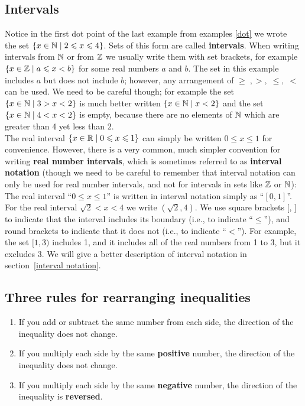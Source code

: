 
\subsection{Intervals}
Notice in the first dot point of the last example from examples \ref{dot} we wrote \\ the set $\left\{x \in \mathbb{N} \mid 2 \leqslant x \leqslant 4\right\}$. Sets of this form are called \textbf{intervals}. \label{intervals} When writing intervals from $\mathbb{N}$ or from $\mathbb{Z}$ we usually write them with set brackets, for example $\left\{x \in \mathbb{Z} \mid a \leqslant x < b\right\}$ for some real numbers $a$ and $b$. The set in this example includes $a$ but does not include $b$; however, any arrangement of $\geq\;, >,\; \leq,\; <$ can be used. We need to be careful though; for example the set $\left\{x \in \mathbb{N} \mid 3 > x < 2\right\}$ is much better written $\left\{x \in \mathbb{N} \mid x < 2\right\}$ and the set $\left\{x \in \mathbb{N} \mid 4 < x < 2\right\}$ is empty, because there are no elements of $\mathbb{N}$ which are greater than 4 yet less than 2. \\

\noindent The real interval $\left\{x \in \mathbb{R} \mid 0 \leqslant x \leqslant 1\right\}$ can simply be written $0 \leq x \leq 1$ for convenience. However, there is a very common, much simpler convention for writing \textbf{real number intervals}, which is sometimes referred to as \textbf{interval notation} (though we need to be careful to remember that interval notation can only be used for real number intervals, and not for intervals in sets like $\mathbb{Z}$ or $\mathbb{N}$): The real interval ``$0 \leq x \leq 1$'' is written in interval notation simply as ``$[0,1]$''. For the real interval $\sqrt{2} < x < 4$ we write $(\sqrt{2},4).$ We use square brackets [, ] \label{symbinterval} to indicate that the interval includes its boundary (i.e., to indicate ``$\leq$''), and round brackets to indicate that it does not (i.e., to indicate ``$<$''). For example, the set $[1,3)$ includes 1, and it includes all of the real numbers from 1 to 3, but it excludes 3. We will give a better description of interval notation in section~\ref{interval notation}. \label{interval notation 1}


\subsection{Three rules for rearranging inequalities} \label{secinecrule}
\begin{enumerate}
\item
If you add or subtract the same number from each side, the direction of the inequality does not change.
\item
If you multiply each side by the same \textbf{positive} number, the direction of the inequality does not change.
\item
If you multiply each side by the same \textbf{negative} number, the direction of the inequality is \textbf{reversed}.
\end{enumerate}
